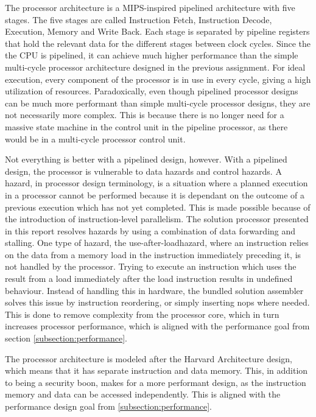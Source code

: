 The processor architecture is a MIPS-inspired pipelined architecture with five stages.
The five stages are called Instruction Fetch, Instruction Decode, Execution, Memory and Write Back.
Each stage is separated by pipeline registers that hold the relevant data for the different stages between clock cycles.
Since the the CPU is pipelined, it can achieve much higher performance than the simple multi-cycle processor architecture designed in the previous assignment\cite{assignment-1}.
For ideal execution, every component of the processor is in use in every cycle, giving a high utilization of resources.
Paradoxically, even though pipelined processor designs can be much more performant than simple multi-cycle processor designs, they are not necessarily more complex.
This is because there is no longer need for a massive state machine in the control unit in the pipeline processor, as there would be in a multi-cycle processor control unit.

Not everything is better with a pipelined design, however.
With a pipelined design, the processor is vulnerable to data hazards and control hazards.
A hazard, in processor design terminology, is a situation where a planned execution in a processor cannot be performed because it is dependant on the outcome of a previous execution which has not yet completed.
This is made possible because of the introduction of instruction-level parallelism.
The solution processor presented in this report resolves hazards by using a combination of data forwarding and stalling.
One type of hazard, the use-after-load\cn hazard, where an instruction relies on the data from a memory load in the instruction immediately preceding it, is not handled by the processor.
Trying to execute an instruction which uses the result from a load immediately after the load instruction results in undefined behaviour.
Instead of handling this in hardware, the bundled solution assembler solves this issue by instruction reordering, or simply inserting nops where needed.
This is done to remove complexity from the processor core, which in turn increases processor performance, which is aligned with the performance goal from section \vref{subsection:performance}.

The processor architecture is modeled after the Harvard Architecture design, which means that it has separate instruction and data memory.
This, in addition to being a security boon, makes for a more performant design, as the instruction memory and data can be accessed independently.
This is aligned with the performance design goal from \vref{subsection:performance}.


